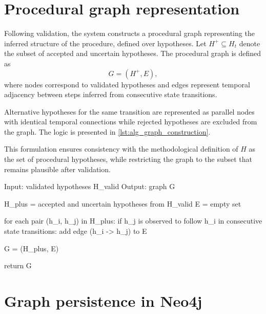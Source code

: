 \documentclass[11pt,titlepage,openright]{book}
\renewenvironment{listing*}[1][]{%
  \begin{listing}[#1]%
    }{%
  \end{listing}}
\begin{document}
\section{Procedural graph representation}

Following validation, the system constructs a procedural graph representing the inferred structure of the procedure, defined over hypotheses. Let $H^{+} \subseteq H_t$ denote the subset of accepted and uncertain hypotheses. The procedural graph is defined as
\[
G = (H^{+}, E),
\]
where nodes correspond to validated hypotheses and edges represent temporal adjacency between steps inferred from consecutive state transitions.

Alternative hypotheses for the same transition are represented as parallel nodes with identical temporal connections while rejected hypotheses are excluded from the graph. The logic is presented in \cref{lst:alg_graph_construction}.

This formulation ensures consistency with the methodological definition of $H$ as the set of procedural hypotheses, while restricting the graph to the subset that remains plausible after validation.

\begin{listing*}
\begin{Code}
Input: validated hypotheses H_valid
Output: graph G

H_plus = accepted and uncertain hypotheses from H_valid
E = empty set

for each pair (h_i, h_j) in H_plus:
    if h_j is observed to follow h_i in consecutive state transitions:
        add edge (h_i -> h_j) to E

G = (H_plus, E)

return G
\end{Code}
\caption{Algorithm for Procedural Graph construction, captures partial ordering and alternative interpretations without introducing execution semantics, as discussed in \cref{sec:layer4-method}).}
\label{lst:alg_graph_construction}
\end{listing*}



\section{Graph persistence in Neo4j}
\end{document}
